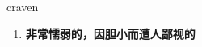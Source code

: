 
\begin{frame}
{\huge craven}
\begin{center}
\begin{enumerate}\Large
  \item \textbf{非常懦弱的，因胆小而遭人鄙视的}
\end{enumerate}
\end{center}
\end{frame}
